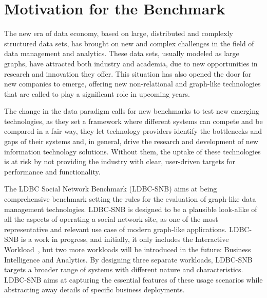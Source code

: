 

\section{Motivation for the Benchmark}

The new era of data economy, based on large, distributed and complexly
structured data sets, has brought on new and complex challenges in the field of
data management and analytics. These data sets, usually modeled as large
graphs, have attracted both industry and academia, due to new
opportunities in research and innovation they offer.  This situation has also
opened the door for new companies to emerge, offering new non-relational and
graph-like technologies that are called to play a significant role in upcoming
years.

The change in the data paradigm calls for new benchmarks to test new
emerging technologies, as they set a framework where different systems can
compete and be compared in a fair way, they let technology providers identify
the bottlenecks and gaps of their systems and, in general, drive the research
and development of new information technology solutions. Without them, the
uptake of these technologies is at risk by not providing the industry with
clear, user-driven targets for performance and functionality.

The LDBC Social Network Benchmark (LDBC-SNB) aims at being comprehensive
benchmark setting the rules for the evaluation of graph-like data management
technologies.  LDBC-SNB is designed to be a plausible look-alike of all the
aspects of operating a social network site, as one of the most representative
and relevant use case of modern graph-like applications. LDBC-SNB is a work in
progress, and initially, it only includes the Interactive Workload~\cite{DBLP:conf/sigmod/ErlingALCGPPB15},
but two more workloads will be introduced in the future: Business
Intelligence and Analytics. By designing three separate workloads, LDBC-SNB
targets a broader range of systems with different nature and characteristics.
LDBC-SNB aims at capturing the essential features of these usage scenarios
while abstracting away details of specific business deployments.


